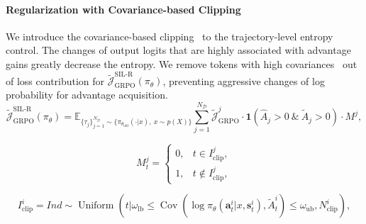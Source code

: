 \documentclass[]{youtu} %
\begin{document}
\paragraph{Regularization with Covariance-based Clipping}
We introduce the covariance-based clipping~\cite{cui2025entropy} to the trajectory-level entropy control.
The changes of output logits that are highly associated with advantage gains greatly decrease the entropy.
We remove tokens with high covariances~\cite{cui2025entropy,wang2025beyond} out of loss contribution for $\tilde{\mathcal{J}}_{\text{GRPO}}^{\text{SIL-R}}(\pi_\theta)$,
preventing aggressive changes of log probability for advantage acquisition.
\begin{equation}\label{eq:grpo_sal_reg}
\tilde{\mathcal{J}}_{\text{GRPO}}^{\text{SIL-R}}(\pi_\theta)=
     \mathbb{E}_{\{\tau_{j}\}_{j=1}^{N_{\mathcal{D}}}\sim \{\pi_{\theta_{\text{old}}}(\cdot|x),\ x\sim p(X)\}}\sum_{j=1}^{N_{\mathcal{D}}}\tilde{\mathcal{J}}_{\text{GRPO}}^{j}\cdot\mathbf{1}(\hat{A}_{j}>0\ \&\ \tilde{A}_{j}>0)\cdot M^{j},
\end{equation}

\begin{equation}\label{eq:regularizationmask}
     M^j_{t}=
     \begin{cases}
         0, &t\in I_{\text{clip}}^{j},\\
         1, &t\notin I_{\text{clip}}^{j},
     \end{cases}
\end{equation}

\begin{equation}\label{eq:clipuniform}
    I_{\text{clip}}^{i}=Ind\sim\operatorname{Uniform}(t|\omega_{\text{lb}}\leq\operatorname{Cov}(\log\pi_{\theta}(\mathbf{a}_t^{i}|x,\mathbf{s}_t^{i}), \tilde{A}_{t}^{i})\leq\omega_{\text{ub}}, N^{i}_{\text{clip}}),
\end{equation}
\end{document}
